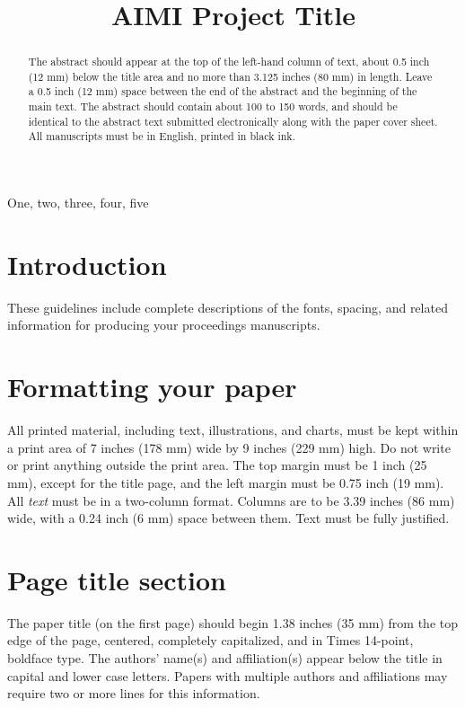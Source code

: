 \documentclass{article}
\title{AIMI Project Title}
\begin{document}
%
\maketitle
%
\begin{abstract}
The abstract should appear at the top of the left-hand column of text, about
0.5 inch (12 mm) below the title area and no more than 3.125 inches (80 mm) in
length.  Leave a 0.5 inch (12 mm) space between the end of the abstract and the
beginning of the main text.  The abstract should contain about 100 to 150
words, and should be identical to the abstract text submitted electronically
along with the paper cover sheet.  All manuscripts must be in English, printed
in black ink.
\end{abstract}
%
\begin{keywords}
One, two, three, four, five
\end{keywords}
%
\section{Introduction}
\label{sec:intro}

These guidelines include complete descriptions of the fonts, spacing, and
related information for producing your proceedings manuscripts.

\section{Formatting your paper}
\label{sec:format}

All printed material, including text, illustrations, and charts, must be kept
within a print area of 7 inches (178 mm) wide by 9 inches (229 mm) high. Do
not write or print anything outside the print area. The top margin must be 1
inch (25 mm), except for the title page, and the left margin must be 0.75 inch
(19 mm).  All {\it text} must be in a two-column format. Columns are to be 3.39
inches (86 mm) wide, with a 0.24 inch (6 mm) space between them. Text must be
fully justified.

\section{Page title section}
\label{sec:pagestyle}

The paper title (on the first page) should begin 1.38 inches (35 mm) from the
top edge of the page, centered, completely capitalized, and in Times 14-point,
boldface type.  The authors' name(s) and affiliation(s) appear below the title
in capital and lower case letters.  Papers with multiple authors and
affiliations may require two or more lines for this information.
\end{document}

